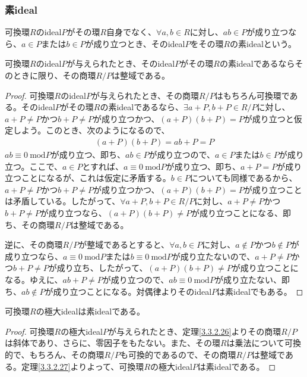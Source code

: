\documentclass[dvipdfmx]{jsarticle}
\begin{document}
\subsubsection{素ideal}%
\begin{dfn}
可換環$R$のideal$P$がその環$R$自身でなく、$\forall a,b \in R$に対し、$ab \in P$が成り立つなら、$a \in P$または$b \in P$が成り立つとき、そのideal$P$をその環$R$の素idealという。
\end{dfn}
\begin{thm}\label{3.3.2.27}
可換環$R$のideal$P$が与えられたとき、そのideal$P$がその環$R$の素idealであるならそのときに限り、その商環${R}/{P}$は整域である。
\end{thm}
\begin{proof}
可換環$R$のideal$P$が与えられたとき、その商環${R}/{P}$はもちろん可換環である。そのideal$P$がその環$R$の素idealであるなら、$\exists a + P,b + P \in {R}/{P}$に対し、$a + P \neq P$かつ$b + P \neq P$が成り立つかつ、$(a + P)(b + P) = P$が成り立つと仮定しよう。このとき、次のようになるので、
\begin{align*}
(a + P)(b + P) = ab + P = P
\end{align*}
$ab \equiv 0\ \mathrm{mod}P $が成り立つ、即ち、$ab \in P$が成り立つので、$a \in P$または$b \in P$が成り立つ。ここで、$a \in P$とすれば、$a \equiv 0\ \mathrm{mod}P $が成り立つ、即ち、$a + P = P$が成り立つことになるが、これは仮定に矛盾する。$b \in P$についても同様であるから、$a + P \neq P$かつ$b + P \neq P$が成り立つかつ、$(a + P)(b + P) = P$が成り立つことは矛盾している。したがって、$\forall a + P,b + P \in {R}/{P}$に対し、$a + P \neq P$かつ$b + P \neq P$が成り立つなら、$(a + P)(b + P) \neq P$が成り立つことになる、即ち、その商環${R}/{P}$は整域である。\par
逆に、その商環${R}/{P}$が整域であるとすると、$\forall a,b \in P$に対し、$a \notin P$かつ$b \notin P$が成り立つなら、$a \equiv 0\ \mathrm{mod}P $または$b \equiv 0\ \mathrm{mod}P $が成り立たないので、$a + P \neq P$かつ$b + P \neq P$が成り立ち、したがって、$(a + P)(b + P) \neq P$が成り立つことになる。ゆえに、$ab + P \neq P$が成り立つので、$ab \equiv 0\ \mathrm{mod}P $が成り立たない、即ち、$ab \notin P$が成り立つことになる。対偶律よりそのideal$P$は素idealでもある。
\end{proof}
\begin{thm}\label{3.3.2.28}
可換環$R$の極大idealは素idealである。
\end{thm}
\begin{proof} 可換環$R$の極大ideal$P$が与えられたとき、定理\ref{3.3.2.26}よりその商環${R}/{P}$は斜体であり、さらに、零因子をもたない。また、その環$R$は乗法について可換的で、もちろん、その商環${R}/{P}$も可換的であるので、その商環${R}/{P}$は整域である。定理\ref{3.3.2.27}よりよって、可換環$R$の極大ideal$P$は素idealである。
\end{proof}
\end{document}
